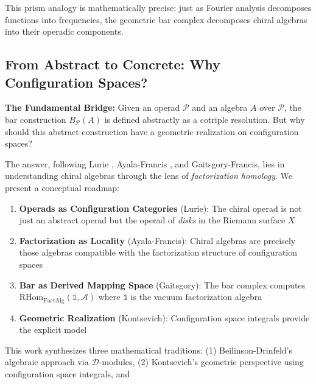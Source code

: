 This prism analogy is mathematically precise: just as Fourier analysis decomposes functions into frequencies, 
the geometric bar complex decomposes chiral algebras into their operadic components.

\subsection{From Abstract to Concrete: Why Configuration Spaces?}

\noindent\textbf{The Fundamental Bridge:} Given an operad $\mathcal{P}$ and an algebra $A$ over $\mathcal{P}$, 
the bar construction $B_{\mathcal{P}}(A)$ is defined abstractly as a cotriple resolution. But why should 
this abstract construction have a geometric realization on configuration spaces?

The answer, following Lurie \cite{HA}, Ayala-Francis \cite{AF}, and Gaitsgory-Francis, lies in understanding 
chiral algebras through the lens of \emph{factorization homology}. We present a conceptual roadmap:

\begin{enumerate}
\item \textbf{Operads as Configuration Categories} (Lurie): The chiral operad is not just an abstract 
operad but the operad of \emph{disks} in the Riemann surface $X$

\item \textbf{Factorization as Locality} (Ayala-Francis): Chiral algebras are precisely those algebras 
compatible with the factorization structure of configuration spaces

\item \textbf{Bar as Derived Mapping Space} (Gaitsgory): The bar complex computes 
$\text{RHom}_{\text{FactAlg}}(\mathbb{1}, \mathcal{A})$ where $\mathbb{1}$ is the vacuum factorization algebra

\item \textbf{Geometric Realization} (Kontsevich): Configuration space integrals provide the explicit model
\end{enumerate}

This work synthesizes three mathematical traditions: (1) Beilinson-Drinfeld's algebraic approach via 
$\mathcal{D}$-modules, (2) Kontsevich's geometric perspective using configuration space integrals, and 


